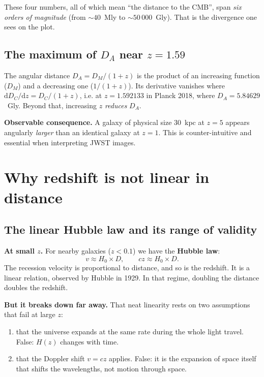 \documentclass[11pt,a4paper,openany]{report}
\newcommand{\Hzero}{H_{0}}
\newcommand{\dif}{\mathrm{d}}
\begin{document}
\noindent These four numbers, all of which mean “the distance to the CMB”,
span \emph{six orders of magnitude} (from $\sim 40$~Mly to $\sim 50\,000$~Gly).
That is the divergence one sees on the plot.

\section{The maximum of $D_{A}$ near $z = 1.59$}

\begin{tcolorbox}[further]
The angular distance $D_A = D_{M}/(1+z)$ is the product of an increasing
function ($D_{M}$) and a decreasing one ($1/(1+z)$). Its derivative vanishes
where $\dif D_C / \dif z = D_C/(1+z)$, i.e. at $z = 1.592133$ in Planck 2018,
where $D_A = 5.84629$~Gly. Beyond that, increasing $z$ \emph{reduces} $D_A$.

\medskip
\textbf{Observable consequence.} A galaxy of physical size $30$~kpc at $z = 5$
appears angularly \emph{larger} than an identical galaxy at $z = 1$. This is
counter-intuitive and essential when interpreting JWST images.
\end{tcolorbox}

\chapter{Why redshift is not linear in distance}
\label{chap:nonlinear}

\section{The linear Hubble law and its range of validity}

\begin{tcolorbox}[plain]
\textbf{At small $z$.} For nearby galaxies ($z < 0.1$) we have the
\textbf{Hubble law}:
\[
v \approx \Hzero \times D, \qquad cz \approx \Hzero \times D.
\]
The recession velocity is proportional to distance, and so is the redshift. It
is a linear relation, observed by Hubble in 1929. In that regime, doubling the
distance doubles the redshift.

\medskip
\textbf{But it breaks down far away.} That neat linearity rests on two
assumptions that fail at large $z$:
\begin{enumerate}[topsep=2pt]
\item that the universe expands at the same rate during the whole light
  travel. False: $H(z)$ changes with time.
\item that the Doppler shift $v = cz$ applies. False: it is the expansion of
  space itself that shifts the wavelengths, not motion through space.
\end{enumerate}
\end{tcolorbox}
\end{document}
